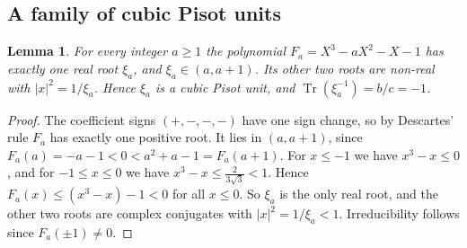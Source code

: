 \documentclass[11pt,a4paper]{article}
\newtheorem{lemma}[theorem]{Lemma}
\theoremstyle{definition}
\theoremstyle{remark}
\DeclareMathOperator{\Tr}{Tr}
\begin{document}
\subsection{A family of cubic Pisot units}
\begin{lemma}\label{lem:family}
For every integer $a\ge1$ the polynomial $F_a=X^3-aX^2-X-1$ has exactly one real root $\xi_a$, and $\xi_a\in(a,a+1)$. Its other two roots are non-real with $|x|^2=1/\xi_a$. Hence $\xi_a$ is a cubic Pisot unit, and $\Tr(\xi_a^{-1})=b/c=-1$.
\end{lemma}
\begin{proof}
The coefficient signs $(+,-,-,-)$ have one sign change, so by Descartes' rule $F_a$ has exactly one positive root. It lies in $(a,a+1)$, since $F_a(a)=-a-1<0<a^2+a-1=F_a(a+1)$.
For $x\le-1$ we have $x^3-x\le0$, and for $-1\le x\le0$ we have $x^3-x\le\frac2{3\sqrt3}<1$. Hence $F_a(x)\le(x^3-x)-1<0$ for all $x\le0$.
So $\xi_a$ is the only real root, and the other two roots are complex conjugates with $|x|^2=1/\xi_a<1$. Irreducibility follows since $F_a(\pm1)\ne0$.
\end{proof}
\end{document}
